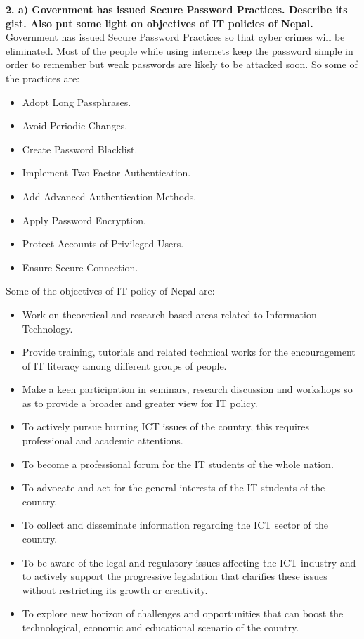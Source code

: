 \documentclass [12pt, a4paper]{article}
\begin{document}
\large
\textbf{2. a) Government has issued Secure Password Practices. Describe its gist. Also put some light on objectives of IT policies of Nepal.}\\
\normalsize
Government has issued Secure Password Practices so that cyber crimes will be eliminated. Most of the people while using internets keep the password simple in order to remember but weak passwords are likely to be attacked soon. So some of the practices are:
\begin{itemize}
	\item Adopt Long Passphrases. 
	\item Avoid Periodic Changes. 
	\item Create Password Blacklist. 
	\item Implement Two-Factor Authentication. 
	\item Add Advanced Authentication Methods. 
	\item Apply Password Encryption. 
	\item Protect Accounts of Privileged Users. 
	\item Ensure Secure Connection.
\end{itemize}

Some of the objectives of IT policy of Nepal are:
\begin{itemize}
	\item Work on theoretical and research based areas related to Information Technology.
	\item Provide training, tutorials and related technical works for the encouragement of IT literacy among different groups of people.
	\item Make a keen participation in seminars, research discussion and workshops so as to provide a broader and greater view for IT policy.
	\item To actively pursue burning ICT issues of the country, this requires professional and academic attentions.
	\item To become a professional forum for the IT students of the whole nation.
	\item To advocate and act for the general interests of the IT students of the country.
	\item To collect and disseminate information regarding the ICT sector of the country.
	\item To be aware of the legal and regulatory issues affecting the ICT industry and to actively support the progressive legislation that clarifies these issues without restricting its growth or creativity.
	\item To explore new horizon of challenges and opportunities that can boost the technological, economic and educational scenario of the country.
\end{itemize}
\end{document}
